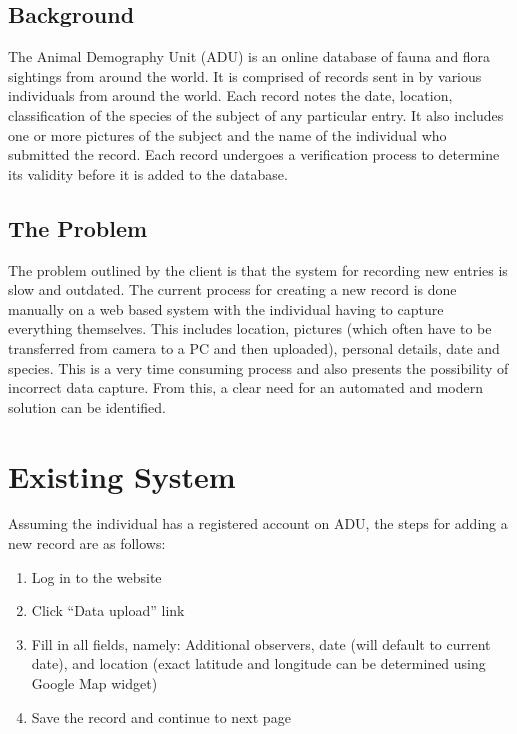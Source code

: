 \documentclass[
10pt, %
a4paper, %
oneside, %
headinclude,footinclude, %
BCOR5mm, %
]{scrartcl}
\begin{document}
\subsection{Background} %
\label{sub:background}

The Animal Demography Unit (ADU) is an online database of fauna and flora sightings from around the world. It is comprised of records sent in by various individuals from around the world. Each record notes the date, location, classification of the species of the subject of any particular entry. It also includes one or more pictures of the subject and the name of the individual who submitted the record. Each record undergoes a verification process to determine its validity before it is added to the database.


\subsection{The Problem} %
\label{sub:the_problem}

The problem outlined by the client is that the system for recording new entries is slow and outdated. The current process for creating a new record is done manually on a web based system with the individual having to capture everything themselves. This includes location, pictures (which often have to be transferred from camera to a PC and then uploaded), personal details, date and species. This is a very time consuming process and also presents the possibility of incorrect data capture. From this, a clear need for an automated and modern solution can be identified.   



\section{Existing System} %
\label{sec:existing_system}

Assuming the individual has a registered account on ADU, the steps for adding  a new record are as follows:

\begin{enumerate}
\item Log in to the website
\item Click ``Data upload'' link
\item Fill in all fields, namely: Additional observers, date (will default to current date), and location (exact latitude and longitude can be determined using Google Map widget)
\item Save the record and continue to next page
\end{enumerate}
\end{document}
